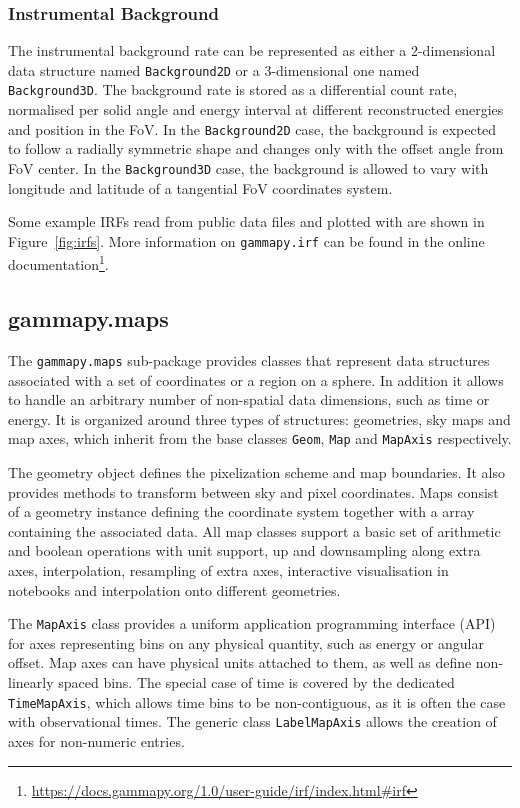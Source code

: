 \documentclass[longauth]{aa}
\newcommand{\code}[1]{\texttt{#1}}
\begin{document}
\subsubsection{Instrumental Background}
The instrumental background rate can be represented as either a 2-dimensional
data structure named \code{Background2D} or a 3-dimensional one named \code{Background3D}.
The background rate is stored as a differential count rate, normalised per solid angle
and energy interval at different reconstructed energies and position in the FoV.
In the \code{Background2D} case, the background is expected to follow a radially symmetric shape
and changes only with the offset angle from FoV center.
In the \code{Background3D} case, the background is allowed to vary with 
longitude and latitude of a tangential FoV coordinates system.

Some example IRFs read from public data files and plotted with \gammapy are shown 
in Figure~\ref{fig:irfs}. More information on \code{gammapy.irf} can be found 
in the online documentation\footnote{\url{https://docs.gammapy.org/1.0/user-guide/irf/index.html\#irf}}.

\subsection{gammapy.maps}
\label{ssec:gammapy-maps}
The \code{gammapy.maps} sub-package provides classes that represent data
structures associated with a set of coordinates or a region on a sphere. In
addition it allows to handle an arbitrary number of non-spatial data
dimensions, such as time or energy. It is organized around three types of
structures: geometries, sky maps and map axes, which inherit from the base
classes \code{Geom}, \code{Map} and \code{MapAxis} respectively.

The geometry object defines the pixelization scheme and map boundaries. It also
provides methods to transform between sky and pixel coordinates. Maps consist
of a geometry instance defining the coordinate system together with a
\numpy array containing the associated data. All map classes support a basic
set of arithmetic and boolean operations with  unit support, up and downsampling
along extra axes, interpolation, resampling of extra axes, interactive visualisation
in notebooks and interpolation onto different geometries.

The \code{MapAxis} class provides a uniform application programming interface
(API) for axes representing
bins on any physical quantity, such as energy or angular offset.
Map axes can have physical units attached to them, as well as define
non-linearly spaced bins. The special case of time is covered by the
dedicated \code{TimeMapAxis}, which allows time bins to be non-contiguous,
as it is often the case with observational times. The generic
class \code{LabelMapAxis} allows the creation of axes for non-numeric entries.
\end{document}

